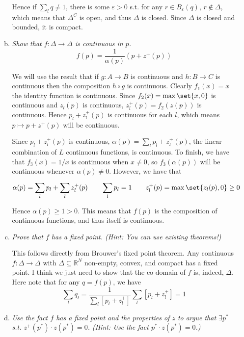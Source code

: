 \documentclass{article}
\begin{document}
\begin{enumerate}[1.]
\begin{enumerate}[a)]
        Hence if $\sum^{}_{l} q \ne 1$, there is some $\varepsilon > 0$ s.t. for any $r \in B_{\varepsilon}(q)$, $r \notin \Delta$, which means that $\Delta^C$ is open, and thus $\Delta$ is closed. Since $\Delta$ is closed and bounded, it is compact.

      \item \textit{Show that $f: \Delta \to \Delta$ is continuous in $p$.}
        \[
          f(p) = \dfrac{1}{\alpha(p)} \left(p + z^+(p)\right)
        \]

        \solution We will use the result that if $g: A \to B$ is continuous and $h: B \to C$ is continuous then the composition $h \circ g$ is continuous. Clearly $f_1(x) = x$ the identity function is continuous. Since $f_2(x) = \max\set{x, 0}$ is continuous and $z_l(p)$ is continuous, $z_l^+(p) = f_2(z(p))$ is continuous. Hence $p_l + z_l^+(p)$ is continuous for each $l$, which means $p \mapsto p + z^+(p)$ will be continuous.

        Since $p_l + z_l^+(p)$ is continuous, $\alpha(p) = \sum^{}_{l} p_l + z_l^+(p)$, the linear combination of $L$ continuous functions, is continuous. To finish, we have that $f_3(x) = 1 / x$ is continuous when $x \ne 0$, so $f_3(\alpha(p))$ will be continuous whenever $\alpha(p) \ne 0$. However, we have that
        \[
          \alpha(p) = \sum^{}_{l} p_l + \sum^{}_{l} z^+_l(p)
          \quad\quad
          \sum^{}_{l} p_l = 1
          \quad\quad
          z^+_l(p) = \max\set{z_l(p), 0} \ge 0
        \]

        Hence $\alpha(p) \ge 1 > 0$. This means that $f(p)$ is the composition of continuous functions, and thus itself is continuous.

      \item \textit{Prove that $f$ has a fixed point. (Hint: You can use existing theorems!)}

        \solution This follows directly from Brouwer's fixed point theorem. Any continuous $f: \Delta \to \Delta$ with $\Delta \subseteq \mathbb{R}^N$ non-empty, convex, and compact has a fixed point. I think we just need to show that the co-domain of $f$ is, indeed, $\Delta$. Here note that for any $q = f(p)$, we have
        \[
          \sum^{}_{l} q_l = \dfrac{1}{\sum^{}_{l} \left[p_l + z^+_l\right]} \sum^{}_{l} \left[p_l + z^+_l\right] = 1
        \]

      \item \textit{Use the fact $f$ has a fixed point and the properties of $z$ to argue that $\exists p^*$ s.t. $z^+(p^*) \cdot z(p^*) = 0$. (Hint: Use the fact $p^* \cdot z(p^*) = 0$.)}


\end{enumerate}
\end{enumerate}
\end{document}
